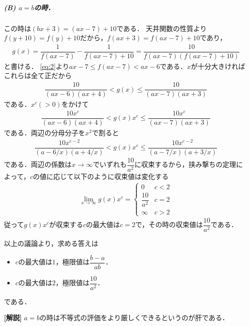 \documentclass[../../main.tex]{subfiles}
\begin{document}
\subparagraph{(B) $a=b$の時．}

この時は$(bx+3)=(ax-7)+10$である．
天井関数の性質より$f(y+10)=f(y)+10$だから，$f(ax+3)=f(ax-7)+10$であり，
\begin{align}
  g(x)=\dfrac{1}{f(ax-7)}-\dfrac{1}{f(ax-7)+10}=\dfrac{10}{f(ax-7)(f(ax-7)+10)}
\end{align}
と書ける．
\cref{eq:2}より$ax-7 \le f(ax-7) < ax-6$である．$x$が十分大きければこれらは全て正だから
\begin{align}
  \dfrac{10}{(ax-6)(ax+4)} < g(x) \le \dfrac{10}{(ax-7)(ax+3)}
\end{align}
である．$x^{c} (>0)$をかけて
\begin{align}
  \dfrac{10x^{c}}{(ax-6)(ax+4)} < g(x)x^c \le \dfrac{10x^{c}}{(ax-7)(ax+3)}
\end{align}
である．両辺の分母分子を$x^2$で割ると
\begin{align}
  \dfrac{10x^{c-2}}{(a-6/x)(a+4/x)} < g(x)x^c \le \dfrac{10x^{c-2}}{(a-7/x)(a+3/x)}
\end{align}
である．両辺の係数は$x\to\infty$でいずれも$\dfrac{10}{a^2}$に収束するから，挟み撃ちの定理によって，$c$の値に応じて以下のように収束値は変化する
\begin{align}
  \lim_{x\to\infty}g(x)x^{c} =
  \begin{cases}
    0 & c<2 \\
    \dfrac{10}{a^2} & c=2 \\
    \infty & c > 2
  \end{cases}
\end{align}
従って$g(x)x^{c}$が収束する$c$の最大値は$c=2$で，その時の収束値は$\dfrac{10}{a^2}$である．
\casesend

以上の議論より，求める答えは
\begin{itemize}
  \item[$a\neq b$の時] $c$の最大値は$1$，極限値は$\dfrac{b-a}{ab}$．
  \item[$a=b$の時] $c$の最大値は$2$，極限値は$\dfrac{10}{a^2}$．
\end{itemize}
である．

{\bf [解説]}
$a=b$の時は不等式の評価をより厳しくできるというのが肝である．

\newpage
\end{document}
